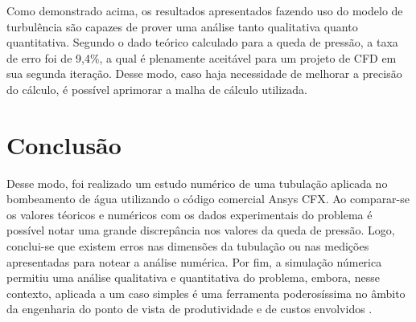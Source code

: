 \documentclass[12pt]{article}
\begin{document}
Como demonstrado acima, os resultados apresentados fazendo uso do modelo de turbulência são capazes de prover uma análise tanto qualitativa quanto quantitativa. Segundo o dado teórico calculado para a queda de pressão, a taxa de erro foi de 9,4\%, a qual é plenamente aceitável para um projeto de CFD em sua segunda iteração. Desse modo, caso haja necessidade de melhorar a precisão do cálculo, é possível aprimorar a malha de cálculo utilizada.

\section{Conclusão}
Desse modo, foi realizado um estudo numérico de uma tubulação aplicada no bombeamento de água utilizando o código comercial Ansys CFX. Ao comparar-se os valores téoricos e numéricos com os dados experimentais do problema é possível notar uma grande discrepância nos valores da queda de pressão. Logo, conclui-se que existem erros nas dimensões da tubulação ou nas medições apresentadas para notear a análise numérica. Por fim, a simulação númerica permitiu uma análise qualitativa e quantitativa do problema, embora, nesse contexto, aplicada a um caso simples é uma ferramenta poderosíssima no âmbito da engenharia do ponto de vista de produtividade e de custos envolvidos \cite{cfd}. 




\end{document}
